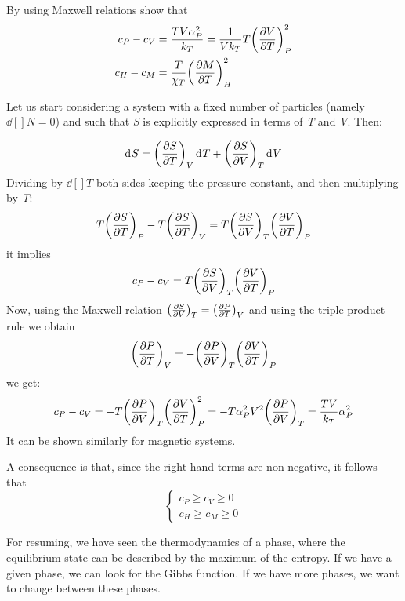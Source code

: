 \documentclass[../../Main/Main.tex]{subfiles}
\begin{document}
\begin{exercise}{}{}
By using Maxwell relations show that
\begin{subequations}
\begin{align}
  c_P - c_V &= \frac{T V \alpha_P ^2}{k_T} = \frac{1}{V k_T} T \qty(\pdv{V}{T} )_P^2 \\
  c_H - c_M &= \frac{T}{\chi _T} \qty(\pdv{M}{T} )_H^2
\end{align}
\end{subequations}
\begin{solution}
Let us start considering a system with a fixed number of particles (namely \( \dd[]{N} =0  \)) and such that \emph{S}  is explicitly expressed in terms of \emph{T}  and \emph{V}.
Then:

\begin{equation*}
  \dd[]{S} = \qty(\pdv{S}{T})_V \dd[]{T} + \qty(\pdv{S}{V} )_T \dd[]{V}
\end{equation*}
Dividing by \( \dd[]{T}  \) both sides keeping the pressure constant, and then multiplying by \emph{T}:
\begin{equation*}
  T \qty(\pdv{S}{T} )_P - T \qty(\pdv{S}{T} )_V = T \qty(\pdv{S}{V} )_T \qty(\pdv{V}{T} )_P
\end{equation*}
it implies
\begin{equation*}
  c_P - c_V = T \qty(\pdv{S}{V} )_T \qty(\pdv{V}{T} )_P
\end{equation*}
Now, using the Maxwell relation \( \qty(\pdv{S}{V} )_T = \qty(\pdv{P}{T} )_V   \) and using the triple product rule we obtain
\begin{equation*}
  \qty(\pdv{P}{T} )_V = - \qty(\pdv{P}{V} )_T \qty(\pdv{V}{T} )_P
\end{equation*}
we get:
\begin{equation*}
  c_P-c_V = - T \qty(\pdv{P}{V} )_T \qty(\pdv{V}{T} )_P^2 =
  -T  \alpha_P^2 V^2 \qty(\pdv{P}{V} )_T
  =\frac{T V}{k_T} \alpha_P^2
\end{equation*}
It can be shown similarly for magnetic systems.
\end{solution}
 A consequence is that, since the right hand terms are non negative,  it follows that
\begin{equation}
  \begin{cases}
   c_P \ge c_V \ge 0  \\
   c_H \ge c_M \ge 0
  \end{cases}
\end{equation}
\end{exercise}

For resuming, we have seen the thermodynamics of a phase, where the equilibrium state can be described by the maximum of the entropy. If we have a given phase, we can look for the Gibbs function. If we have more phases, we want to change between these phases.
\end{document}
